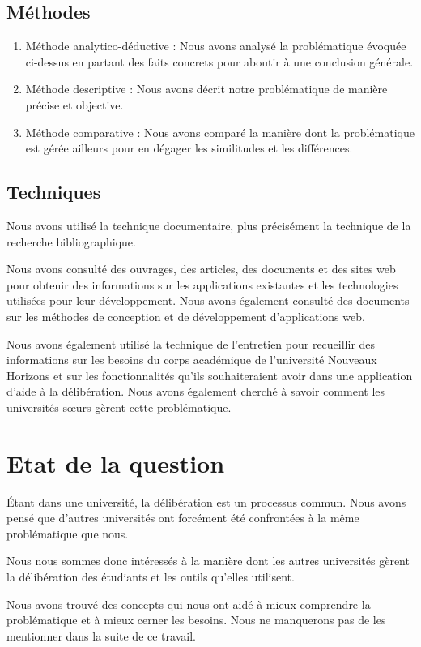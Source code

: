 \subsection*{Méthodes}
\begin{enumerate}
    \item Méthode analytico-déductive : Nous avons analysé la problématique évoquée ci-dessus en partant des faits concrets pour aboutir à une conclusion générale.
    \item Méthode descriptive : Nous avons décrit notre problématique de manière précise et objective.
    \item Méthode comparative : Nous avons comparé la manière dont la problématique est gérée ailleurs pour en dégager les similitudes et les différences.
\end{enumerate}

\subsection*{Techniques}
Nous avons utilisé la technique documentaire, plus précisément la technique de la recherche bibliographique.

Nous avons consulté des ouvrages, des articles, des documents et des sites web pour obtenir des informations sur les applications existantes et les technologies utilisées pour leur développement. Nous avons également consulté des documents sur les méthodes de conception et de développement d'applications web.

Nous avons également utilisé la technique de l'entretien pour recueillir des informations sur les besoins du corps académique de l'université Nouveaux Horizons et sur les fonctionnalités qu'ils souhaiteraient avoir dans une application d'aide à la délibération. Nous avons également cherché à savoir comment les universités sœurs gèrent cette problématique.
\section{Etat de la question}
Étant dans une université, la délibération est un processus commun. Nous avons pensé que d'autres universités ont forcément été confrontées à la même problématique que nous.

Nous nous sommes donc intéressés à la manière dont les autres universités gèrent la délibération des étudiants et les outils qu'elles utilisent.

Nous avons trouvé des concepts qui nous ont aidé à mieux comprendre la problématique et à mieux cerner les besoins. Nous ne manquerons pas de les mentionner dans la suite de ce travail.
